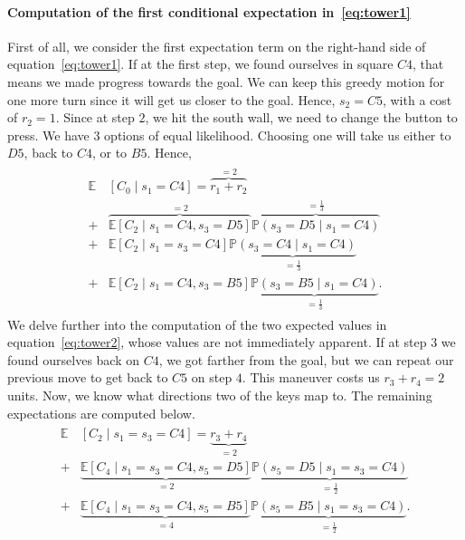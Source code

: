 \paragraph{Computation of the first conditional expectation
in~\eqref{eq:tower1}} 
First of all, we consider the first expectation term on the right-hand side of
equation~\eqref{eq:tower1}. If at the first step, we found ourselves in square 
$C4$, that means we made progress towards the goal. We can keep this greedy 
motion for one more turn since it will get us closer to the goal. Hence, $s_2 = 
C5$, with a cost of $r_2 = 1$. Since at step $2$, we hit the south wall, we need
to change the button to press. We have $3$ options of equal likelihood. Choosing
one will take us either to $D5$, back to $C4$, or to $B5$. Hence,
%
\begin{align}
    \begin{split}
    \mathbb{E}&\left[ C_0 \mid s_1 = C4 \right] = \overbrace{r_1 + r_2}^{=2} 
    \\ + &\overbrace{\mathbb{E}[C_2 \mid s_1 = C4, s_3 = D5]}^{=2} \overbrace{\mathbb{P}(s_3 = D5 \mid s_1 = C4)}^{=\frac{1}{3}} 
    \\ + &\mathbb{E}[C_2 \mid s_1 = s_3 = C4] \underbrace{\mathbb{P}(s_3 = C4 \mid s_1 = C4)}_{=\frac{1}{3}} \\
    + &\mathbb{E}[C_2 \mid s_1 = C4, s_3 = B5] \underbrace{\mathbb{P}(s_3 = B5 \mid s_1 = C4)}_{=\frac{1}{3}}.
    \end{split}
    \label{eq:tower2}
\end{align}
%
We delve further into the computation of the two expected values in
equation~\eqref{eq:tower2}, whose values are not immediately apparent. If at 
step $3$ we found ourselves back on $C4$, we got farther from the goal, but 
we can repeat our previous move to get back to $C5$ on step $4$. This maneuver 
costs us $r_3 + r_4 = 2$ units. Now, we know what directions two of the keys map to. The remaining expectations are computed below.
%
\begin{align*}
    \begin{split}
    \mathbb{E}&[C_2 \mid s_1=s_3=C4] = \underbrace{r_3+r_4}_{=2}
    \\ + &\underbrace{\mathbb{E}[C_4 \mid s_1=s_3=C4, s_5=D5]}_{=2} \underbrace{\mathbb{P}(s_5=D5 \mid s_1=s_3=C4)}_{=\frac{1}{2}} \\
    + &\underbrace{\mathbb{E}[C_4 \mid s_1=s_3=C4, s_5=B5]}_{=4} \underbrace{\mathbb{P}(s_5=B5 \mid s_1=s_3=C4)}_{=\frac{1}{2}}.
    \end{split}
\end{align*}
